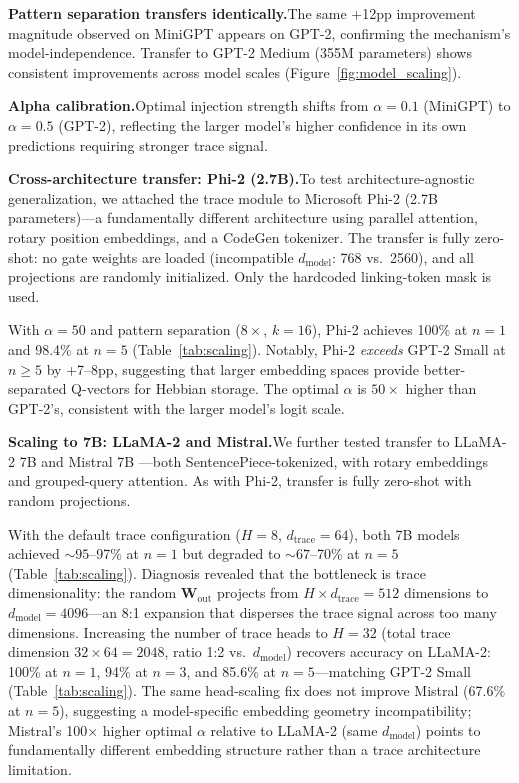\documentclass[11pt,a4paper]{article}
\begin{document}
\textbf{Pattern separation transfers identically.}\quad The same +12pp improvement magnitude observed on MiniGPT appears on GPT-2, confirming the mechanism's model-independence. Transfer to GPT-2 Medium (355M parameters) shows consistent improvements across model scales (Figure~\ref{fig:model_scaling}).

\textbf{Alpha calibration.}\quad Optimal injection strength shifts from $\alpha{=}0.1$ (MiniGPT) to $\alpha{=}0.5$ (GPT-2), reflecting the larger model's higher confidence in its own predictions requiring stronger trace signal.

\textbf{Cross-architecture transfer: Phi-2 (2.7B).}\quad To test architecture-agnostic generalization, we attached the trace module to Microsoft Phi-2 \citep{javaheripi2023phi} (2.7B parameters)---a fundamentally different architecture using parallel attention, rotary position embeddings, and a CodeGen tokenizer. The transfer is fully zero-shot: no gate weights are loaded (incompatible $d_{\text{model}}$: 768 vs.\ 2560), and all projections are randomly initialized. Only the hardcoded linking-token mask is used.

With $\alpha{=}50$ and pattern separation ($8\times$, $k{=}16$), Phi-2 achieves 100\% at $n{=}1$ and 98.4\% at $n{=}5$ (Table~\ref{tab:scaling}). Notably, Phi-2 \emph{exceeds} GPT-2 Small at $n{\geq}5$ by +7--8pp, suggesting that larger embedding spaces provide better-separated Q-vectors for Hebbian storage. The optimal $\alpha$ is $50\times$ higher than GPT-2's, consistent with the larger model's logit scale.

\textbf{Scaling to 7B: LLaMA-2 and Mistral.}\quad We further tested transfer to LLaMA-2 7B \citep{touvron2023llama} and Mistral 7B \citep{jiang2023mistral}---both SentencePiece-tokenized, with rotary embeddings and grouped-query attention. As with Phi-2, transfer is fully zero-shot with random projections.

With the default trace configuration ($H{=}8$, $d_{\text{trace}}{=}64$), both 7B models achieved ${\sim}95$--97\% at $n{=}1$ but degraded to ${\sim}67$--70\% at $n{=}5$ (Table~\ref{tab:scaling}). Diagnosis revealed that the bottleneck is trace dimensionality: the random $\mathbf{W}_{\text{out}}$ projects from $H \times d_{\text{trace}} = 512$ dimensions to $d_{\text{model}}{=}4096$---an 8:1 expansion that disperses the trace signal across too many dimensions. Increasing the number of trace heads to $H{=}32$ (total trace dimension $32 \times 64 = 2048$, ratio 1:2 vs.\ $d_{\text{model}}$) recovers accuracy on LLaMA-2: 100\% at $n{=}1$, 94\% at $n{=}3$, and 85.6\% at $n{=}5$---matching GPT-2 Small (Table~\ref{tab:scaling}). The same head-scaling fix does not improve Mistral (67.6\% at $n{=}5$), suggesting a model-specific embedding geometry incompatibility; Mistral's 100$\times$ higher optimal $\alpha$ relative to LLaMA-2 (same $d_{\text{model}}$) points to fundamentally different embedding structure rather than a trace architecture limitation.
\end{document}

